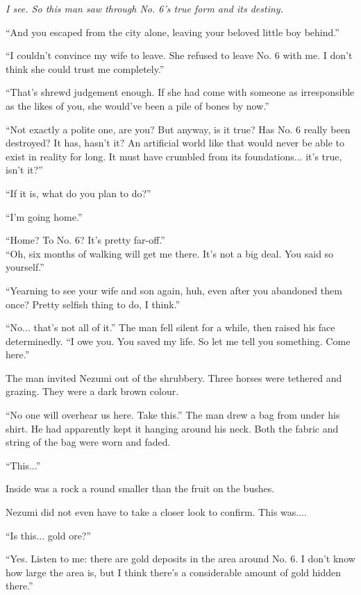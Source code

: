 \emph{I see. So this man saw through No. 6's true form and its destiny.}

``And you escaped from the city alone, leaving your beloved little boy
behind.''

``I couldn't convince my wife to leave. She refused to leave No. 6 with
me. I don't think she could trust me completely.''

``That's shrewd judgement enough. If she had come with someone as
irresponsible as the likes of you, she would've been a pile of bones by
now.''

``Not exactly a polite one, are you? But anyway, is it true? Has No. 6
really been destroyed? It has, hasn't it? An artificial world like that
would never be able to exist in reality for long. It must have crumbled
from its foundations... it's true, isn't it?''

``If it is, what do you plan to do?''

``I'm going home.''

``Home? To No. 6? It's pretty far-off.''\\

``Oh, six months of walking will get me there. It's not a big deal. You
said so yourself.''

``Yearning to see your wife and son again, huh, even after you abandoned
them once? Pretty selfish thing to do, I think.''

``No... that's not all of it.'' The man fell silent for a while, then
raised his face determinedly. ``I owe you. You saved my life. So let me
tell you something. Come here.''

The man invited Nezumi out of the shrubbery. Three horses were tethered
and grazing. They were a dark brown colour.

``No one will overhear us here. Take this.'' The man drew a bag from
under his shirt. He had apparently kept it hanging around his neck. Both
the fabric and string of the bag were worn and faded.

``This...''

Inside was a rock a round smaller than the fruit on the bushes.~

Nezumi did not even have to take a closer look to confirm. This was....

``Is this... gold ore?''

``Yes. Listen to me: there are gold deposits in the area around No. 6. I
don't know how large the area is, but I think there's a considerable
amount of gold hidden there.''


